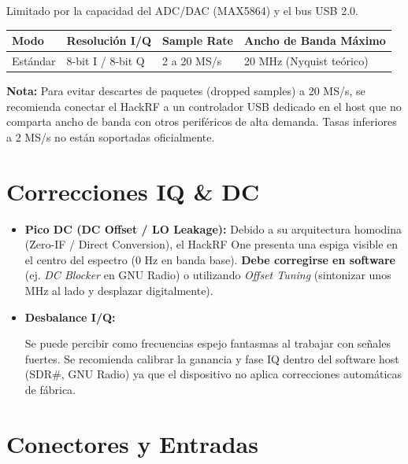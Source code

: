 \documentclass[11pt]{article}
\begin{document}
Limitado por la capacidad del ADC/DAC (MAX5864) y el bus USB 2.0.

\begin{table}[h]
    \centering
    \begin{tabular}{llll}
        \toprule
        \textbf{Modo} & \textbf{Resolución I/Q} & \textbf{Sample Rate} & \textbf{Ancho de Banda Máximo} \\
        \midrule
        Estándar  & 8-bit I / 8-bit Q & 2 a 20 MS/s & 20 MHz (Nyquist teórico) \\
        \bottomrule
    \end{tabular}
\end{table}

\textbf{Nota:} Para evitar descartes de paquetes (dropped samples) a 20 MS/s, se recomienda conectar el HackRF a un controlador USB dedicado en el host que no comparta ancho de banda con otros periféricos de alta demanda. Tasas inferiores a 2 MS/s no están soportadas oficialmente.

\section{Correcciones IQ \& DC}

\begin{itemize}
    \item \textbf{Pico DC (DC Offset / LO Leakage):} Debido a su arquitectura homodina (Zero-IF / Direct Conversion), el HackRF One presenta una espiga visible en el centro del espectro (0 Hz en banda base). \textbf{Debe corregirse en software} (ej. \textit{DC Blocker} en GNU Radio) o utilizando \textit{Offset Tuning} (sintonizar unos MHz al lado y desplazar digitalmente).
    \item \textbf{Desbalance I/Q:}
    \begin{pendiente}
    Se puede percibir como frecuencias espejo fantasmas al trabajar con señales fuertes. Se recomienda calibrar la ganancia y fase IQ dentro del software host (SDR\#, GNU Radio) ya que el dispositivo no aplica correcciones automáticas de fábrica.
    \end{pendiente}
\end{itemize}

\section{Conectores y Entradas}
\end{document}
